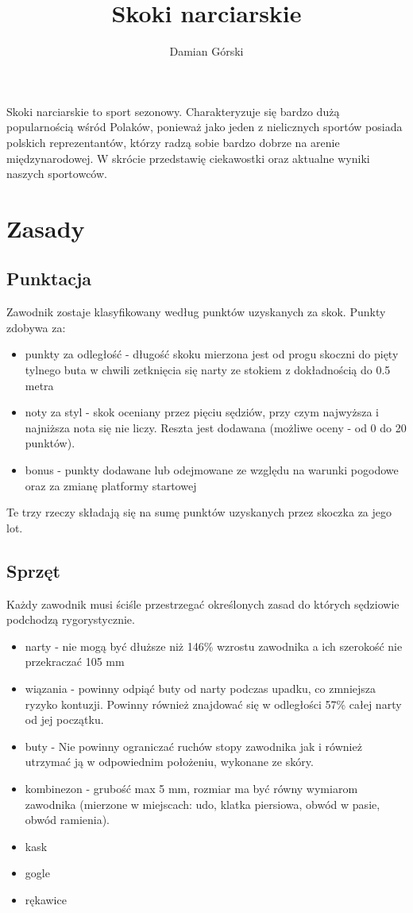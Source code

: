 \documentclass[11pt]{article}
\title{Skoki narciarskie}
\author{Damian Górski}
\begin{document}
\maketitle
\noindent
\newpage
\tableofcontents
\newpage
Skoki narciarskie to sport sezonowy. Charakteryzuje się bardzo dużą popularnością wśród Polaków, ponieważ jako jeden z nielicznych sportów posiada polskich reprezentantów, którzy radzą sobie bardzo dobrze na arenie międzynarodowej. W skrócie przedstawię ciekawostki oraz aktualne wyniki naszych sportowców.
\section{Zasady}
\subsection{Punktacja}
Zawodnik zostaje klasyfikowany według punktów uzyskanych za skok. Punkty zdobywa za: 
\begin{itemize}
\item punkty za odległość - długość skoku mierzona jest od progu skoczni do pięty tylnego buta w chwili zetknięcia się narty ze stokiem z dokładnością do 0.5 metra
\item noty za styl - skok oceniany przez pięciu sędziów, przy czym najwyższa i najniższa nota się nie liczy. Reszta jest dodawana (możliwe oceny - od 0 do 20 punktów).
\item bonus - punkty dodawane lub odejmowane ze względu na warunki pogodowe oraz za zmianę platformy startowej
\end{itemize}
Te trzy rzeczy składają się na sumę punktów uzyskanych przez skoczka za jego lot.
\subsection{Sprzęt}
Każdy zawodnik musi ściśle przestrzegać określonych zasad do których sędziowie podchodzą rygorystycznie.
\begin{itemize}
\item narty - nie mogą być dłuższe niż 146\% wzrostu zawodnika a ich szerokość nie przekraczać 105 mm
\item wiązania - powinny odpiąć buty od narty podczas upadku, co zmniejsza ryzyko kontuzji. Powinny również znajdować się w odległości 57\% całej narty od jej początku.
\item buty - Nie powinny ograniczać ruchów stopy zawodnika jak i również utrzymać ją w odpowiednim położeniu, wykonane ze skóry.
\item kombinezon - grubość max 5 mm, rozmiar ma być równy wymiarom zawodnika (mierzone w miejscach: udo, klatka piersiowa, obwód w pasie, obwód ramienia).
\item kask
\item gogle
\item rękawice
\end{itemize}
\end{document}
